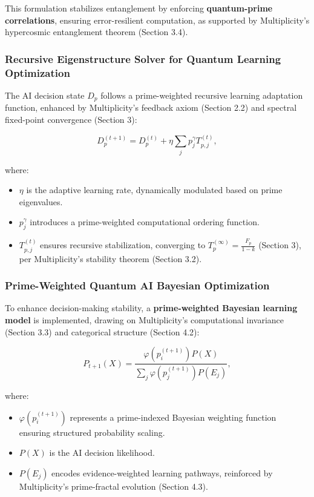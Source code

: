 \documentclass[12pt]{article}
\begin{document}
This formulation stabilizes entanglement by enforcing \textbf{quantum-prime correlations}, ensuring error-resilient computation, as supported by Multiplicity’s hypercosmic entanglement theorem (Section 3.4).

\subsubsection{Recursive Eigenstructure Solver for Quantum Learning Optimization}

The AI decision state \(D_p\) follows a prime-weighted recursive learning adaptation function, enhanced by Multiplicity’s feedback axiom (Section 2.2) and spectral fixed-point convergence (Section 3):

\begin{equation}
    D_p^{(t+1)} = D_p^{(t)} + \eta \sum_{j} p_j^{\gamma} T_{p, j}^{(t)},
\end{equation}

where:
\begin{itemize}
    \item \(\eta\) is the adaptive learning rate, dynamically modulated based on prime eigenvalues.
    \item \(p_j^{\gamma}\) introduces a prime-weighted computational ordering function.
    \item \(T_{p, j}^{(t)}\) ensures recursive stabilization, converging to \(T_p^{(\infty)} = \frac{F_p}{1 - k}\) (Section 3), per Multiplicity’s stability theorem (Section 3.2).
\end{itemize}

\subsubsection{Prime-Weighted Quantum AI Bayesian Optimization}

To enhance decision-making stability, a \textbf{prime-weighted Bayesian learning model} is implemented, drawing on Multiplicity’s computational invariance (Section 3.3) and categorical structure (Section 4.2):

\begin{equation}
    P_{t+1}(X) = \frac{\varphi(p_i^{(t+1)}) P(X)}{\sum_j \varphi(p_j^{(t+1)}) P(E_j)},
\end{equation}

where:
\begin{itemize}
    \item \(\varphi(p_i^{(t+1)})\) represents a prime-indexed Bayesian weighting function ensuring structured probability scaling.
    \item \(P(X)\) is the AI decision likelihood.
    \item \(P(E_j)\) encodes evidence-weighted learning pathways, reinforced by Multiplicity’s prime-fractal evolution (Section 4.3).
\end{itemize}
\end{document}

